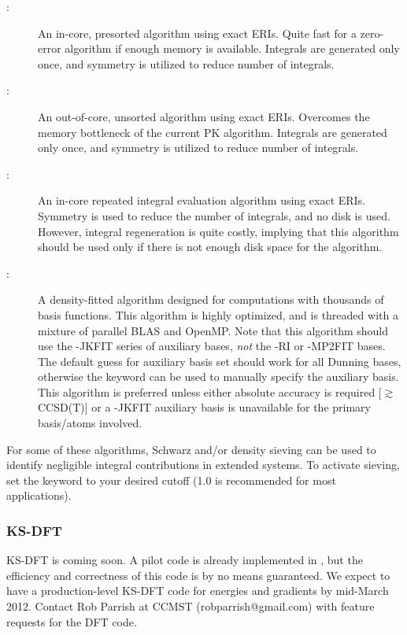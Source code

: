 \begin{description}
\item[:] An in-core, presorted algorithm using exact ERIs. Quite fast
for a zero-error algorithm if enough memory is available. Integrals are
generated only once, and symmetry is utilized to reduce number of integrals. 
\item[:] An out-of-core, unsorted algorithm using exact
ERIs. Overcomes the memory bottleneck of the current PK algorithm. Integrals are
generated only once, and symmetry is utilized to reduce number of integrals. 
\item[:] An in-core repeated integral evaluation algorithm using
exact ERIs. Symmetry is used to reduce the number of integrals, and no disk is
used. However, integral regeneration is quite costly, implying that this
algorithm should be used only if there is not enough disk space for the
 algorithm. 
\item[:] A density-fitted algorithm designed for computations with
thousands of basis functions. This algorithm is highly optimized, and is
threaded with a mixture of parallel BLAS and OpenMP. Note that this algorithm
should use the -JKFIT series of auxiliary bases, \emph{not} the -RI or -MP2FIT
bases. The default guess for auxiliary basis set should work for all Dunning
bases, otherwise the  keyword can be used to manually
specify the auxiliary basis. This algorithm is preferred unless either
absolute accuracy is required [$\gtrsim$CCSD(T)] or a -JKFIT auxiliary basis is
unavailable for the primary basis/atoms involved. 
\end{description}

For some of these algorithms, Schwarz and/or density sieving can be used to
identify negligible integral contributions in extended systems. To activate
sieving, set the  keyword to your desired cutoff
(1.0 is recommended for most applications).

\subsubsection{KS-DFT} 

KS-DFT is coming soon. A pilot code is already implemented in \PSIfour, but the
efficiency and correctness of this code is by no means guaranteed. We expect to
have a production-level KS-DFT code for energies and gradients by mid-March
2012. Contact Rob Parrish at CCMST (robparrish@gmail.com) with feature requests
for the DFT code. 

